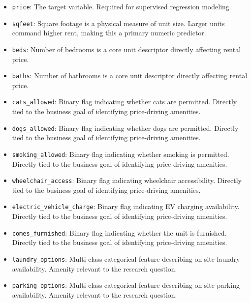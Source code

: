 \begin{itemize}
    \item \texttt{price}: The target variable. Required for supervised regression modeling.

    \item \texttt{sqfeet}: Square footage is a physical measure of unit size. Larger units command higher rent, making this a primary numeric predictor.

    \item \texttt{beds}: Number of bedrooms is a core unit descriptor directly affecting rental price.

    \item \texttt{baths}: Number of bathrooms is a core unit descriptor directly affecting rental price.

    \item \texttt{cats\_allowed}: Binary flag indicating whether cats are permitted. Directly tied to the business goal of identifying price-driving amenities.

    \item \texttt{dogs\_allowed}: Binary flag indicating whether dogs are permitted. Directly tied to the business goal of identifying price-driving amenities.

    \item \texttt{smoking\_allowed}: Binary flag indicating whether smoking is permitted. Directly tied to the business goal of identifying price-driving amenities.

    \item \texttt{wheelchair\_access}: Binary flag indicating wheelchair accessibility. Directly tied to the business goal of identifying price-driving amenities.

    \item \texttt{electric\_vehicle\_charge}: Binary flag indicating EV charging availability. Directly tied to the business goal of identifying price-driving amenities.

    \item \texttt{comes\_furnished}: Binary flag indicating whether the unit is furnished. Directly tied to the business goal of identifying price-driving amenities.

    \item \texttt{laundry\_options}: Multi-class categorical feature describing on-site laundry availability. Amenity relevant to the research question.

    \item \texttt{parking\_options}: Multi-class categorical feature describing on-site parking availability. Amenity relevant to the research question.


\end{itemize}

